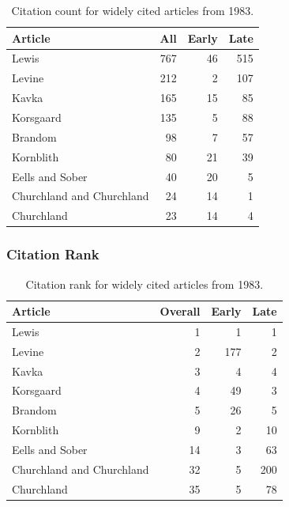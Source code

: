 \documentclass[
  10pt,
  letterpaper,
  DIV=11,
  numbers=noendperiod,
  twoside]{scrartcl}
\begin{document}
\begin{longtable}[]{@{}lrrr@{}}

\caption{\label{tbl-citation-count-1983}Citation count for widely cited
articles from 1983.}

\tabularnewline

\toprule\noalign{}
Article & All & Early & Late \\
\midrule\noalign{}
\endhead
\bottomrule\noalign{}
\endlastfoot
Lewis & 767 & 46 & 515 \\
Levine & 212 & 2 & 107 \\
Kavka & 165 & 15 & 85 \\
Korsgaard & 135 & 5 & 88 \\
Brandom & 98 & 7 & 57 \\
Kornblith & 80 & 21 & 39 \\
Eells and Sober & 40 & 20 & 5 \\
Churchland and Churchland & 24 & 14 & 1 \\
Churchland & 23 & 14 & 4 \\

\end{longtable}

\subsubsection*{Citation Rank}\label{sec-rank-1983}

\begin{longtable}[]{@{}lrrr@{}}

\caption{\label{tbl-citation-rank-1983}Citation rank for widely cited
articles from 1983.}

\tabularnewline

\toprule\noalign{}
Article & Overall & Early & Late \\
\midrule\noalign{}
\endhead
\bottomrule\noalign{}
\endlastfoot
Lewis & 1 & 1 & 1 \\
Levine & 2 & 177 & 2 \\
Kavka & 3 & 4 & 4 \\
Korsgaard & 4 & 49 & 3 \\
Brandom & 5 & 26 & 5 \\
Kornblith & 9 & 2 & 10 \\
Eells and Sober & 14 & 3 & 63 \\
Churchland and Churchland & 32 & 5 & 200 \\
Churchland & 35 & 5 & 78 \\

\end{longtable}
\end{document}
